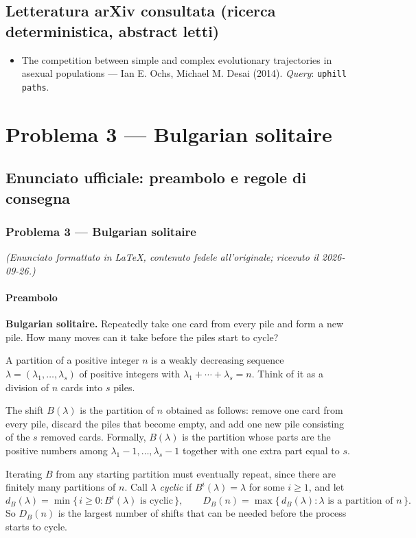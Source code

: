 \documentclass[11pt,a4paper]{article}
\begin{document}
\subsection{Letteratura arXiv consultata (ricerca deterministica, abstract letti)}
\begin{itemize}
\item \cite{1412.3893v1} The competition between simple and complex evolutionary trajectories in asexual populations — Ian E. Ochs, Michael M. Desai (2014). \emph{Query}: \texttt{uphill paths}.
\end{itemize}
\section{Problema 3 — Bulgarian solitaire}
\subsection{Enunciato ufficiale: preambolo e regole di consegna}
\subsubsection{Problema 3 --- Bulgarian
solitaire}\label{problema-3-bulgarian-solitaire}

\emph{(Enunciato formattato in LaTeX, contenuto fedele all'originale;
ricevuto il 2026-09-26.)}

\paragraph{Preambolo}\label{preambolo}

\textbf{Bulgarian solitaire.} Repeatedly take one card from every pile
and form a new pile. How many moves can it take before the piles start
to cycle?

A partition of a positive integer \(n\) is a weakly decreasing sequence
\(\lambda = (\lambda_1, \ldots, \lambda_s)\) of positive integers with
\(\lambda_1 + \cdots + \lambda_s = n\). Think of it as a division of
\(n\) cards into \(s\) piles.

The shift \(B(\lambda)\) is the partition of \(n\) obtained as follows:
remove one card from every pile, discard the piles that become empty,
and add one new pile consisting of the \(s\) removed cards. Formally,
\(B(\lambda)\) is the partition whose parts are the positive numbers
among \(\lambda_1 - 1, \ldots, \lambda_s - 1\) together with one extra
part equal to \(s\).

Iterating \(B\) from any starting partition must eventually repeat,
since there are finitely many partitions of \(n\). Call \(\lambda\)
\emph{cyclic} if \(B^i(\lambda) = \lambda\) for some \(i \ge 1\), and
let \[
d_B(\lambda) = \min\{\, i \ge 0 : B^i(\lambda) \text{ is cyclic} \,\}, \qquad
D_B(n) = \max\{\, d_B(\lambda) : \lambda \text{ is a partition of } n \,\}.
\] So \(D_B(n)\) is the largest number of shifts that can be needed
before the process starts to cycle.
\end{document}
